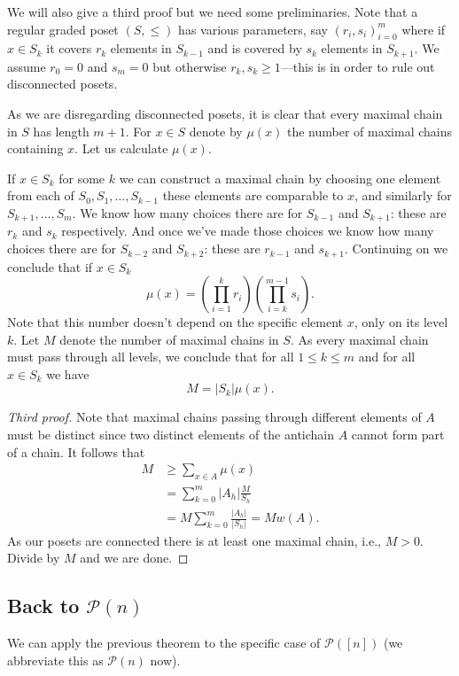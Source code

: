 \documentclass{report}
\theoremstyle{definition}
\theoremstyle{plain}
\theoremstyle{definition}
\begin{document}
 	We will also give a third proof but we need some preliminaries. Note that a regular graded poset $(S,\leq)$ has various parameters, say $(r_i,s_i)_{i=0}^m$ where if $x\in S_k$ it covers $r_k$ elements in $S_{k-1}$ and is covered by $s_k$ elements in $S_{k+1}$. We assume $r_0 = 0$ and $s_m = 0$ but otherwise $r_k,s_k\geq 1$---this is in order to rule out disconnected posets.
 	
 	As we are disregarding disconnected posets, it is clear that every maximal chain in $S$ has length $m+1$. For $x\in S$ denote by $\mu(x)$ the number of maximal chains containing $x$. Let us calculate $\mu(x)$.
 	
 	If $x\in S_k$ for some $k$ we can construct a maximal chain by choosing one element from each of $S_{0},S_{1},\ldots, S_{k-1}$ these elements are comparable to $x$, and similarly for $S_{k+1},\ldots,S_{m}$. We know how many choices there are for $S_{k-1}$ and $S_{k+1}$: these are $r_k$ and $s_k$ respectively. And once we've made those choices we know how many choices there are for $S_{k-2}$ and $S_{k+2}$: these are $r_{k-1}$ and $s_{k+1}$. Continuing on we conclude that if $x\in S_k$
 	\[
 		\mu(x) = \left(\prod_{i=1}^{k}r_i\right)\left(\prod_{i = k}^{m-1}s_{i}\right).
 	\]
 	Note that this number doesn't depend on the specific element $x$, only on its level $k$. Let $M$ denote the number of maximal chains in $S$. As every maximal chain must pass through all levels, we conclude that for all $1\leq k \leq m$ and for all $x\in S_k$ we have
 	\[
 		M = |S_k|\mu(x).
 	\]
 	\begin{proof}[Third proof]
 		Note that maximal chains passing through different elements of $A$ must be distinct since two distinct elements of the antichain $A$ cannot form part of a chain. It follows that
 		\begin{align*}
 			M &\geq \sum_{x\in A}\mu(x)\\
 			&= \sum_{k = 0}^{m}|A_h|\frac{M}{S_h}\\
 			&= M\sum_{k=0}^{m}\frac{|A_h|}{|S_h|} = Mw(A).
 		\end{align*}
 		As our posets are connected there is at least one maximal chain, i.e., $M>0$. Divide by $M$ and we are done.
 	\end{proof}
 	\subsection{Back to $\mathcal{P}(n)$}
 	We can apply the previous theorem to the specific case of $\mathcal{P}([n])$ (we abbreviate this as $\mathcal{P}(n)$ now).
 	
\end{document}
